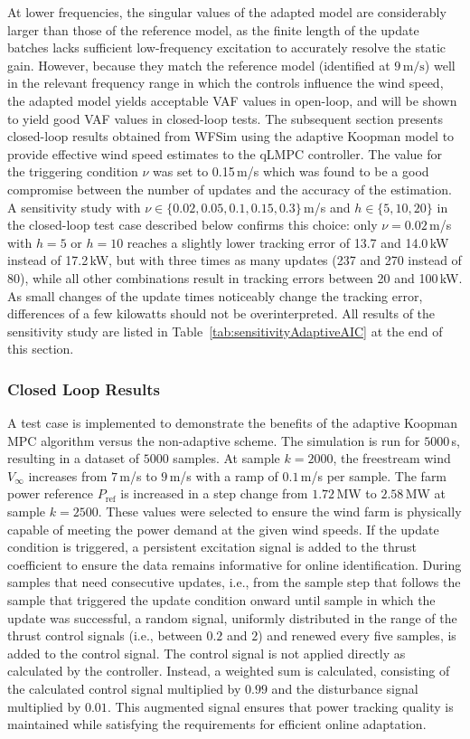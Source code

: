At lower frequencies, the singular values of the adapted model are considerably larger than those of the reference model, as the finite length of the update batches lacks sufficient low-frequency excitation to accurately resolve the static gain. However, because they match the reference model (identified at $9\,\mathrm{m/s}$) well in the relevant frequency range in which the controls influence the wind speed, the adapted model yields acceptable VAF values in open-loop, and will be shown to yield good VAF values in closed-loop tests.
The subsequent section presents closed-loop results obtained from WFSim using the adaptive Koopman model to provide effective wind speed estimates to the qLMPC controller. The value for the triggering condition $\nu$ was set to 0.15\,m/s which was found to be a good compromise between the number of updates and the accuracy of the estimation. A sensitivity study with $\nu \in \{0.02, 0.05, 0.1, 0.15, 0.3\}$\,m/s and $h \in \{5, 10, 20\}$ in the closed-loop test case described below confirms this choice: only $\nu = 0.02$\,m/s with $h = 5$ or $h = 10$ reaches a slightly lower tracking error of 13.7 and 14.0\,kW instead of 17.2\,kW, but with three times as many updates (237 and 270 instead of 80), while all other combinations result in tracking errors between 20 and 100\,kW. As small changes of the update times noticeably change the tracking error, differences of a few kilowatts should not be overinterpreted. All results of the sensitivity study are listed in Table~\ref{tab:sensitivityAdaptiveAIC} at the end of this section.

\subsubsection{Closed Loop Results}
A test case is implemented to demonstrate the benefits of the adaptive Koopman MPC algorithm versus the non-adaptive scheme. The simulation is run for $5000$\,s, resulting in a dataset of $5000$ samples. At sample $k = 2000$, the freestream wind $V_\infty$ increases from $7$\,m/s to $9$\,m/s with a ramp of $0.1$\,m/s per sample. The farm power reference $P_{\text{ref}}$ is increased in a step change from $1.72$\,MW to $2.58$\,MW at sample $k = 2500$. These values were selected to ensure the wind farm is physically capable of meeting the power demand at the given wind speeds. If the update condition is triggered, a persistent excitation signal is added to the thrust coefficient to ensure the data remains informative for online identification. During samples that need consecutive updates, i.e., from the sample step that follows the sample that triggered the update condition onward until sample in which the update was successful, a random signal, uniformly distributed in the range of the thrust control signals (i.e., between $0.2$ and $2$) and renewed every five samples, is added to the control signal. The control signal is not applied directly as calculated by the controller. Instead, a weighted sum is calculated, consisting of the calculated control signal multiplied by $0.99$ and the disturbance signal multiplied by $0.01$. This augmented signal ensures that power tracking quality is maintained while satisfying the requirements for efficient online adaptation.

